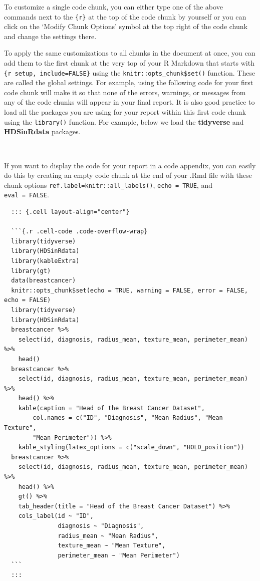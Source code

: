 \documentclass[
  letterpaper,
]{krantz}
\begin{document}
To customize a single code chunk, you can either type one of the above
commands next to the \texttt{\{r\}} at the top of the code chunk by
yourself or you can click on the `Modify Chunk Options' symbol at the
top right of the code chunk and change the settings there.

To apply the same customizations to all chunks in the document at once,
you can add them to the first chunk at the very top of your R Markdown
that starts with
\texttt{\textasciigrave{}\textasciigrave{}\textasciigrave{}\{r\ setup,\ include=FALSE\}}
using the \texttt{knitr::opts\_chunk\$set()} function. These are called
the global settings. For example, using the following code for your
first code chunk will make it so that none of the errors, warnings, or
messages from any of the code chunks will appear in your final report.
It is also good practice to load all the packages you are using for your
report within this first code chunk using the \texttt{library()}
function. For example, below we load the \textbf{tidyverse} and
\textbf{HDSinRdata} packages.

\begin{verbatim}
  
\end{verbatim}

If you want to display the code for your report in a code appendix, you
can easily do this by creating an empty code chunk at the end of your
.Rmd file with these chunk options
\texttt{ref.label=knitr::all\_labels()}, \texttt{echo\ =\ TRUE}, and
\texttt{eval\ =\ FALSE}.

\begin{verbatim}
  ::: {.cell layout-align="center"}
  
  ```{.r .cell-code .code-overflow-wrap}
  library(tidyverse)
  library(HDSinRdata)
  library(kableExtra)
  library(gt)
  data(breastcancer)
  knitr::opts_chunk$set(echo = TRUE, warning = FALSE, error = FALSE, echo = FALSE)
  library(tidyverse)
  library(HDSinRdata)
  breastcancer %>% 
    select(id, diagnosis, radius_mean, texture_mean, perimeter_mean) %>%   
    head()
  breastcancer %>% 
    select(id, diagnosis, radius_mean, texture_mean, perimeter_mean) %>% 
    head() %>% 
    kable(caption = "Head of the Breast Cancer Dataset", 
        col.names = c("ID", "Diagnosis", "Mean Radius", "Mean Texture", 
        "Mean Perimeter")) %>%   
    kable_styling(latex_options = c("scale_down", "HOLD_position"))
  breastcancer %>% 
    select(id, diagnosis, radius_mean, texture_mean, perimeter_mean) %>% 
    head() %>% 
    gt() %>%
    tab_header(title = "Head of the Breast Cancer Dataset") %>%
    cols_label(id ~ "ID", 
               diagnosis ~ "Diagnosis", 
               radius_mean ~ "Mean Radius", 
               texture_mean ~ "Mean Texture",
               perimeter_mean ~ "Mean Perimeter")
  ```
  :::
\end{verbatim}
\end{document}
